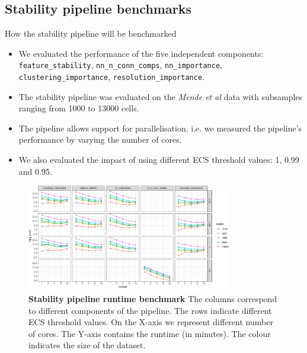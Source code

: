 \subsection{Stability pipeline benchmarks}

\begin{frame}{How the stability pipeline will be benchmarked}
    \begin{itemize}[<+->]
        \item We evaluated the performance of the five independent components: \texttt{feature\_stability}, \texttt{nn\_n\_conn\_comps}, \texttt{nn\_importance}, \texttt{clustering\_importance}, \texttt{resolution\_importance}.
        \item The stability pipeline was evaluated on the \textit{Mende et al} data \cite{Mende2022} with subsamples ranging from 1000 to 13000 cells.
        \item The pipeline allows support for parallelisation, i.e. we measured the pipeline's performance by varying the number of cores.
        \item We also evaluated the impact of using different ECS threshold values: 1, 0.99 and 0.95.
    \end{itemize}
\end{frame}

\begin{frame}
    \begin{figure}
                \includegraphics[width=0.8\textwidth]{images/ch4/4_pipeline.png}
                \caption{\justifying \textbf{Stability pipeline runtime benchmark} The columns correspond to different components of the pipeline. The rows indicate different ECS threshold values. On the X-axis we represent different number of cores. The Y-axis contains the runtime (in minutes). The colour indicates the size of the dataset.} %
            \end{figure}
\end{frame}